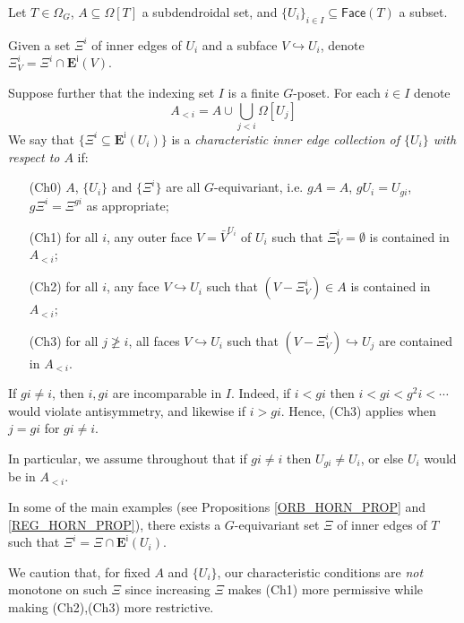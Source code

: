 \documentclass[a4paper,10pt
]{article}%
\begin{document}
\begin{definition}\label{CHAREDGE DEF}
	Let $T \in \Omega_G$, $A \subseteq \Omega[T]$ a subdendroidal set, and $\{U_i\}_{i \in I} \subseteq \mathsf{Face}(T)$ a subset.

	Given a set $\Xi^i$ of inner edges of $U_i$ and a subface $V \hookrightarrow U_i$, denote $\Xi_V^i = \Xi^i \cap \boldsymbol{E}^{\mathsf{i}}(V)$.

	Suppose further that the indexing set $I$ is a 
	finite $G$-poset. For each $i \in I$ denote
\[
	A_{<i} = A \cup \bigcup_{j<i} \Omega[U_j]
\]
	We say that $\{\Xi^i \subseteq \boldsymbol{E}^{\mathsf{i}}(U_i)\}$
	is a \textit{characteristic inner edge collection of $\{U_i\}$ with respect to $A$} if:
	\begin{itemize}
	\item[(Ch0)] $A$, $\{U_i\}$ and $\{\Xi^i\}$ are all $G$-equivariant, i.e. $g A = A$, $g U_i = U_{gi}$, $g \Xi^i = \Xi^{gi}$ as appropriate; 
	\item[(Ch1)] for all $i$, any outer face $V = \bar{V}^{U_i}$
		of $U_i$ such that $\Xi_{V}^i = \emptyset$
		is contained in $A_{<i}$;
	\item[(Ch2)] for all $i$, any face
		$V \hookrightarrow U_i$ such that $(V-\Xi_V^i) \in A$
		is contained in $A_{<i}$;
	\item[(Ch3)] for all $j \not \geq i$, 
		all faces $V \hookrightarrow U_i$ such that 
		$(V-\Xi^i_V) \hookrightarrow U_j$
		are contained in $A_{<i}$.
	\end{itemize}
\end{definition}


\begin{remark}\label{XIIII REM}
If $g i \neq i$, then $i,g i$ are incomparable in $I$. Indeed, if $i<gi$ then $i<gi<g^2i<\cdots$ would violate antisymmetry, and likewise if $i>gi$.
Hence, (Ch3) applies when $j=gi$ for $gi\neq i$.

In particular, we assume throughout that if
$gi \neq i$ then $U_{gi} \neq U_i$,
or else $U_i$ would be in $A_{<i}$.
\end{remark}


\begin{remark}\label{SOMEMAIN REM}
In some of the main examples (see Propositions \ref{ORB_HORN_PROP} and \ref{REG_HORN_PROP}), there exists a $G$-equivariant set 
$\Xi$ of inner edges of $T$ such that $\Xi^i = \Xi \cap \boldsymbol{E}^{\mathsf{i}}(U_i)$.
	
We caution that, for fixed $A$ and $\{U_i\}$, our characteristic conditions are \textit{not} monotone on such $\Xi$ since increasing $\Xi$ makes (Ch1) more permissive while making (Ch2),(Ch3) more restrictive.
\end{remark}
\end{document}
